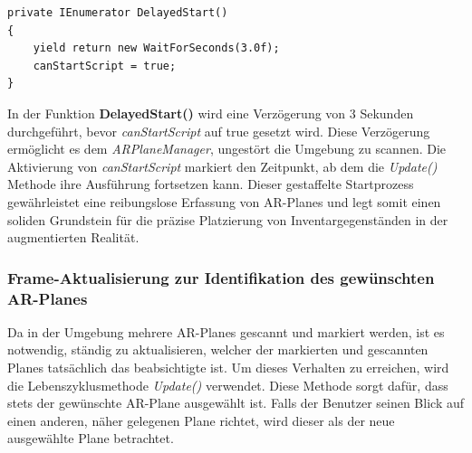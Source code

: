 \begin{lstlisting}[style=csharp, caption={Verzoegerter Start}, label=code:DelayedStart]
private IEnumerator DelayedStart()
{
    yield return new WaitForSeconds(3.0f);
    canStartScript = true;
}
\end{lstlisting}
In der Funktion \textbf{DelayedStart()} wird eine Verzögerung von 3 Sekunden durchgeführt, bevor \textit{canStartScript}
auf true gesetzt wird. Diese Verzögerung ermöglicht es dem \textit{ARPlaneManager}, ungestört die Umgebung zu scannen.
Die Aktivierung von \textit{canStartScript} markiert den Zeitpunkt, ab dem die \textit{Update()} Methode ihre Ausführung
fortsetzen kann. Dieser gestaffelte Startprozess gewährleistet eine reibungslose Erfassung von AR-Planes und legt somit
einen soliden Grundstein für die präzise Platzierung von Inventargegenständen in der augmentierten Realität.

\subsubsection{Frame-Aktualisierung zur Identifikation des gewünschten AR-Planes}
Da in der Umgebung mehrere AR-Planes gescannt und markiert werden, ist es notwendig, ständig zu aktualisieren, welcher
der markierten und gescannten Planes tatsächlich das beabsichtigte ist. Um dieses Verhalten zu erreichen, wird die
Lebenszyklusmethode \textit{Update()} verwendet. Diese Methode sorgt dafür, dass stets der gewünschte AR-Plane
ausgewählt ist. Falls der Benutzer seinen Blick auf einen anderen, näher gelegenen Plane richtet, wird dieser als der
neue ausgewählte Plane betrachtet.\\

